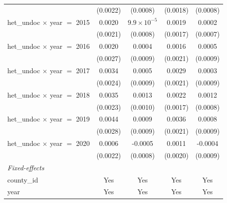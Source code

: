 \begin{tabular}{lcccc}
                                                   & (0.0022)           & (0.0008)                  & (0.0018)               & (0.0008)\\   
   het\_undoc $\times$ year $=$ 2015               & 0.0020             & $9.9\times 10^{-5}$       & 0.0019                 & 0.0002\\   
                                                   & (0.0021)           & (0.0008)                  & (0.0017)               & (0.0007)\\   
   het\_undoc $\times$ year $=$ 2016               & 0.0020             & 0.0004                    & 0.0016                 & 0.0005\\   
                                                   & (0.0027)           & (0.0009)                  & (0.0021)               & (0.0009)\\   
   het\_undoc $\times$ year $=$ 2017               & 0.0034             & 0.0005                    & 0.0029                 & 0.0003\\   
                                                   & (0.0024)           & (0.0009)                  & (0.0021)               & (0.0009)\\   
   het\_undoc $\times$ year $=$ 2018               & 0.0035             & 0.0013                    & 0.0022                 & 0.0012\\   
                                                   & (0.0023)           & (0.0010)                  & (0.0017)               & (0.0008)\\   
   het\_undoc $\times$ year $=$ 2019               & 0.0044             & 0.0009                    & 0.0036                 & 0.0008\\   
                                                   & (0.0028)           & (0.0009)                  & (0.0021)               & (0.0009)\\   
   het\_undoc $\times$ year $=$ 2020               & 0.0006             & -0.0005                   & 0.0011                 & -0.0004\\   
                                                   & (0.0022)           & (0.0008)                  & (0.0020)               & (0.0009)\\   
   \midrule
   \emph{Fixed-effects}\\
   county\_id                                      & Yes                & Yes                       & Yes                    & Yes\\  
   year                                            & Yes                & Yes                       & Yes                    & Yes\\  

\end{tabular}
